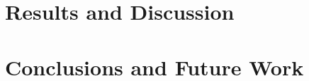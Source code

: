\documentclass[conference]{IEEEtran}
\begin{document}
\section{Results and Discussion}

\blindtext[2]

\section{Conclusions and Future Work}

\blindtext[3]




 

\end{document}
